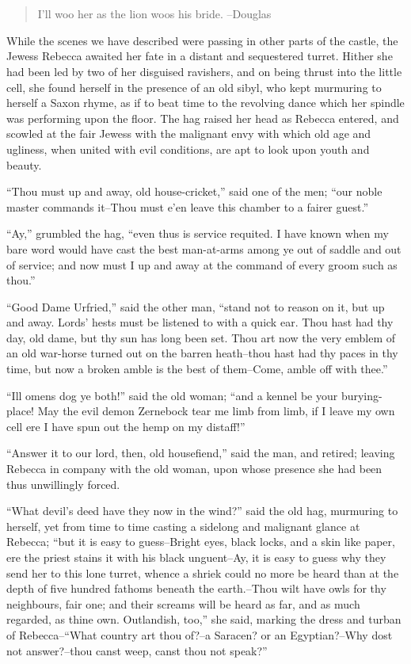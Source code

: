 \chapter{}

\begin{quote}
I'll woo her as the lion woos his bride.
--Douglas
\end{quote}

While the scenes we have described were passing in other parts of the
castle, the Jewess Rebecca awaited her fate in a distant and sequestered
turret. Hither she had been led by two of her disguised ravishers, and
on being thrust into the little cell, she found herself in the presence
of an old sibyl, who kept murmuring to herself a Saxon rhyme, as if to
beat time to the revolving dance which her spindle was performing upon
the floor. The hag raised her head as Rebecca entered, and scowled at
the fair Jewess with the malignant envy with which old age and ugliness,
when united with evil conditions, are apt to look upon youth and beauty.

``Thou must up and away, old house-cricket,'' said one of the men; ``our
noble master commands it--Thou must e'en leave this chamber to a fairer
guest.''

``Ay,'' grumbled the hag, ``even thus is service requited. I have known
when my bare word would have cast the best man-at-arms among ye out of
saddle and out of service; and now must I up and away at the command of
every groom such as thou.''

``Good Dame Urfried,'' said the other man, ``stand not to reason on it,
but up and away. Lords' hests must be listened to with a quick ear. Thou
hast had thy day, old dame, but thy sun has long been set. Thou art now
the very emblem of an old war-horse turned out on the barren heath--thou
hast had thy paces in thy time, but now a broken amble is the best of
them--Come, amble off with thee.''

``Ill omens dog ye both!'' said the old woman; ``and a kennel be your
burying-place! May the evil demon Zernebock tear me limb from limb, if I
leave my own cell ere I have spun out the hemp on my distaff!''

``Answer it to our lord, then, old housefiend,'' said the man, and
retired; leaving Rebecca in company with the old woman, upon whose
presence she had been thus unwillingly forced.

``What devil's deed have they now in the wind?'' said the old hag,
murmuring to herself, yet from time to time casting a sidelong and
malignant glance at Rebecca; ``but it is easy to guess--Bright eyes,
black locks, and a skin like paper, ere the priest stains it with his
black unguent--Ay, it is easy to guess why they send her to this lone
turret, whence a shriek could no more be heard than at the depth of five
hundred fathoms beneath the earth.--Thou wilt have owls for thy
neighbours, fair one; and their screams will be heard as far, and as
much regarded, as thine own. Outlandish, too,'' she said, marking the
dress and turban of Rebecca--``What country art thou of?--a Saracen? or
an Egyptian?--Why dost not answer?--thou canst weep, canst thou not
speak?''

